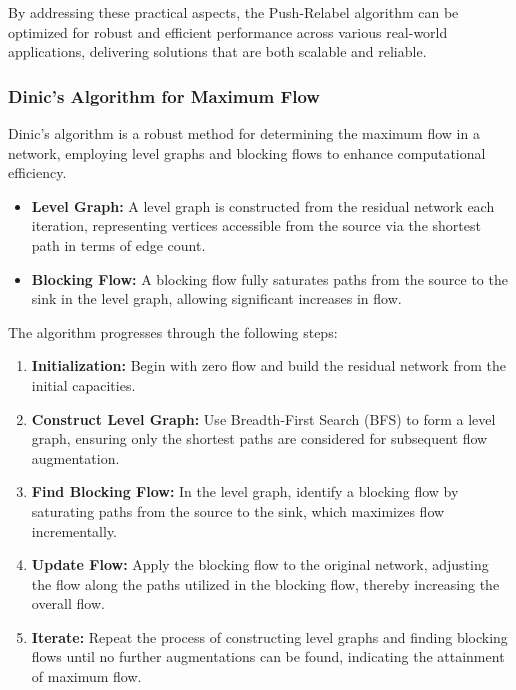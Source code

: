 \documentclass[12pt]{book} %
\begin{document}
By addressing these practical aspects, the Push-Relabel algorithm can be optimized for robust and efficient performance across various real-world applications, delivering solutions that are both scalable and reliable.


\subsubsection{Dinic's Algorithm for Maximum Flow}

Dinic's algorithm is a robust method for determining the maximum flow in a network, employing level graphs and blocking flows to enhance computational efficiency.

\begin{itemize}
    \item \textbf{Level Graph:} A level graph is constructed from the residual network each iteration, representing vertices accessible from the source via the shortest path in terms of edge count.
    
    \item \textbf{Blocking Flow:} A blocking flow fully saturates paths from the source to the sink in the level graph, allowing significant increases in flow.
\end{itemize}

The algorithm progresses through the following steps:

\begin{enumerate}
    \item \textbf{Initialization:} Begin with zero flow and build the residual network from the initial capacities.
    
    \item \textbf{Construct Level Graph:} Use Breadth-First Search (BFS) to form a level graph, ensuring only the shortest paths are considered for subsequent flow augmentation.
    
    \item \textbf{Find Blocking Flow:} In the level graph, identify a blocking flow by saturating paths from the source to the sink, which maximizes flow incrementally.
    
    \item \textbf{Update Flow:} Apply the blocking flow to the original network, adjusting the flow along the paths utilized in the blocking flow, thereby increasing the overall flow.
    
    \item \textbf{Iterate:} Repeat the process of constructing level graphs and finding blocking flows until no further augmentations can be found, indicating the attainment of maximum flow.
\end{enumerate}
\end{document}
